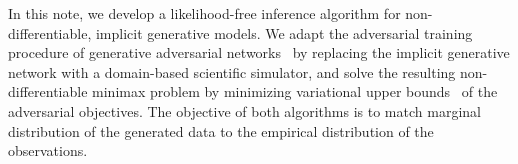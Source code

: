 \documentclass[twocolumn,superscriptaddress,aps]{revtex4-1}
\newcommand{\bftheta}{{\bm \theta}}
\theoremstyle{plain}
\begin{document}
In this note, we develop a likelihood-free inference algorithm
for non-differentiable, implicit generative models.
We adapt the adversarial
training procedure of generative adversarial
networks~\cite{goodfellow2014generative} by replacing the implicit generative
network with a domain-based scientific simulator, and solve the resulting
non-differentiable minimax problem by minimizing variational upper
bounds~\citep{2011arXiv1106.4487W,2012arXiv1212.4507S} of the adversarial
objectives.
The objective of both algorithms is to match marginal distribution of
the generated data to the empirical distribution of the observations.





\end{document}
